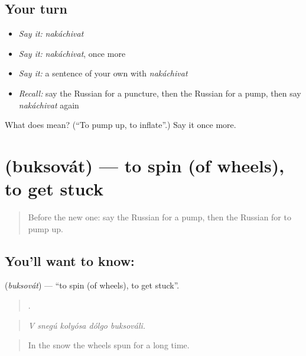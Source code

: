 \subsection*{Your turn}
\begin{itemize}
\raggedright
  \item \emph{Say it:} \emph{nakáchivat}
  \item \emph{Say it:} \emph{nakáchivat}, once more
  \item \emph{Say it:} a sentence of your own with \emph{nakáchivat}
  \item \emph{Recall:} say the Russian for a puncture, then the Russian for a pump, then say \emph{nakáchivat} again
\end{itemize}

\begin{tcolorbox}[breakable,colback=teal!4,colframe=teal!35!black,title={Before you move on}]
What does  mean? (\textquotedblleft{}To pump up, to inflate\textquotedblright{}.) Say it once more.
\end{tcolorbox}
\section[\texorpdfstring{\ru{буксовать} (buksovát)}{буксовать (buksovát)}]{ (buksovát) — to spin (of wheels), to get stuck}

\label{lesson:RU-C405-buksovat}



\begin{quote}
Before the new one: say the Russian for a pump, then the Russian for to pump up.
\end{quote}

\subsection*{You'll want to know: }
\textbf{} (\emph{buksovát}) — \textquotedblleft{}to spin (of wheels), to get stuck\textquotedblright{}.

\begin{quote}
    .
\end{quote}

\begin{quote}
\emph{V snegú kolyósa dólgo buksováli.}
\end{quote}

\begin{quote}
In the snow the wheels spun for a long time.
\end{quote}

